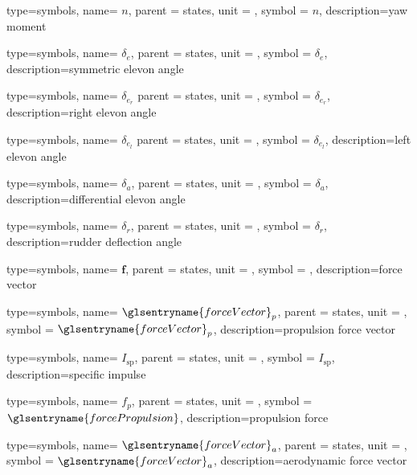 {type=symbols,
	name= \ensuremath{n},
	parent = {states},
	unit = \unexpanded{\si{\newton\meter}},
	symbol = \ensuremath{n},
	description={yaw moment}
}

{type=symbols,
	name= \ensuremath{\delta_{e}},
	parent = {states},
	unit = \unexpanded{\si{\radian}},
	symbol = \ensuremath{\delta_{e}},
	description={symmetric elevon angle}
}

{type=symbols,
name= \ensuremath{\delta_{e_{r}}}
parent = {states},
unit = \unexpanded{\si{\radian}},
symbol = \ensuremath{\delta_{e_{r}}},
description={right elevon angle}
}


{type=symbols,
name= \ensuremath{\delta_{e_{l}}}
parent = {states},
unit = \unexpanded{\si{\radian}},
symbol = \ensuremath{\delta_{e_{l}}},
description={left elevon angle}
}



{type=symbols,
	name= \ensuremath{\delta_{a}},
	parent = {states},
	unit = \unexpanded{\si{\degree}},
	symbol = \ensuremath{\delta_{a}},
	description={differential elevon angle}
}

{type=symbols,
	name= \ensuremath{\delta_{r}},
	parent = {states},
	unit = \unexpanded{\si{\degree}},
	symbol = \ensuremath{\delta_{r}},
	description={rudder deflection angle}
}

{type=symbols,
	name= \ensuremath{\mathbf{f}},
	parent = {states},
	unit = \unexpanded{\si{\newton}},
	symbol = ,
	description={force vector}
}

{type=symbols,
	name= \ensuremath{{\glsentryname{forceVector}}_{p}},
	parent = {states},
	unit = \unexpanded{\si{\newton}},
	symbol = \ensuremath{{\glsentryname{forceVector}}_{p}},
	description={propulsion force vector}
}

{type=symbols,
	name= \ensuremath{I_\textrm{sp}},
	parent = {states},
	unit = \unexpanded{\si{\second}},
	symbol = \ensuremath{I_\textrm{sp}},
	description={specific impulse}
}


{type=symbols,
	name= \ensuremath{f_{p}},
	parent = {states},
	unit = \unexpanded{\si{\newton}},
	symbol = \ensuremath{\glsentryname{forcePropulsion}},
	description={propulsion force}
}


{type=symbols,
	name= \ensuremath{{\glsentryname{forceVector}}_{a}},
	parent = {states},
	unit = \unexpanded{},
	symbol = \ensuremath{{\glsentryname{forceVector}}_{a}},
	description={aerodynamic force vector}
}

